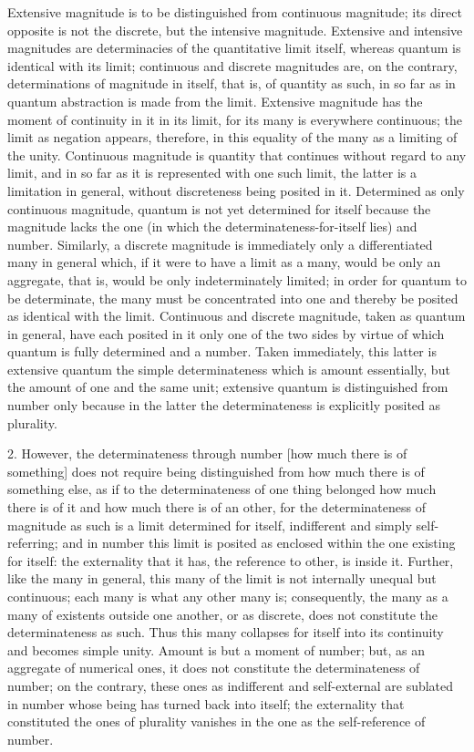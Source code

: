 Extensive magnitude is to be distinguished from continuous magnitude;
its direct opposite is not the discrete, but the intensive magnitude.
Extensive and intensive magnitudes are determinacies of
the quantitative limit itself,
whereas quantum is identical with its limit;
continuous and discrete magnitudes are, on the contrary,
determinations of magnitude in itself,
that is, of quantity as such, in so far as
in quantum abstraction is made from the limit.
Extensive magnitude has the moment of continuity in it
in its limit, for its many is everywhere continuous;
the limit as negation appears, therefore,
in this equality of the many as a limiting of the unity.
Continuous magnitude is quantity that continues
without regard to any limit,
and in so far as it is represented with one such limit,
the latter is a limitation in general,
without discreteness being posited in it.
Determined as only continuous magnitude,
quantum is not yet determined for itself
because the magnitude lacks the one
(in which the determinateness-for-itself lies)
and number.
Similarly, a discrete magnitude is
immediately only a differentiated many in general
which, if it were to have a limit as a many,
would be only an aggregate,
that is, would be only indeterminately limited;
in order for quantum to be determinate,
the many must be concentrated
into one and thereby be posited as identical with the limit.
Continuous and discrete magnitude, taken as quantum in general,
have each posited in it only one of the two sides
by virtue of which quantum is fully determined and a number.
Taken immediately, this latter is extensive quantum
the simple determinateness which is amount essentially,
but the amount of one and the same unit;
extensive quantum is distinguished from number
only because in the latter the determinateness is
explicitly posited as plurality.

2. However, the determinateness through number
[how much there is of something]
does not require being distinguished from
how much there is of something else,
as if to the determinateness of one thing belonged
how much there is of it
and how much there is of an other,
for the determinateness of magnitude as such
is a limit determined for itself,
indifferent and simply self-referring;
and in number this limit is posited
as enclosed within the one existing for itself:
the externality that it has,
the reference to other, is inside it.
Further, like the many in general,
this many of the limit is
not internally unequal but continuous;
each many is what any other many is;
consequently, the many as a many of
existents outside one another,
or as discrete, does not constitute
the determinateness as such.
Thus this many collapses for itself
into its continuity and becomes simple unity.
Amount is but a moment of number;
but, as an aggregate of numerical ones,
it does not constitute the determinateness of number;
on the contrary, these ones as indifferent and self-external are
sublated in number whose being has turned back into itself;
the externality that constituted the ones of plurality vanishes
in the one as the self-reference of number.

